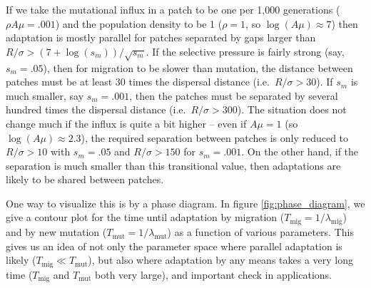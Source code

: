 \documentclass{article}
\newcommand{\migrate}{\lambda_\text{mig}}
\newcommand{\mutrate}{\lambda_\text{mut}}
\newcommand{\Tmig}{T_\text{mig}}
\newcommand{\Tmut}{T_\text{mut}}
\begin{document}
If we take the mutational influx in a patch to be one per 1,000 generations ($\rho A \mu = .001$)
and the population density to be 1 ($\rho =1$, so $\log(A\mu)\approx 7$)
then adaptation is mostly parallel for patches separated by gaps larger than $R/\sigma > (7+\log(s_m))/\sqrt{s_m}$.
If the selective pressure is fairly strong (say, $s_m=.05$),
then for migration to be slower than mutation,
the distance between patches must be at least 30 times the dispersal distance (i.e.\ $R/\sigma > 30$).
If $s_m$ is much smaller, say $s_m = .001$, 
then the patches must be separated by several hundred times the dispersal distance (i.e.\ $R/\sigma > 300$).
The situation does not change much if the influx is quite a bit higher -- even if $A \mu = 1$ (so $\log(A\mu) \approx 2.3$),
the required separation between patches is only reduced to $R/\sigma > 10$ with $s_m=.05$ and $R/\sigma>150$ for $s_m=.001$.
On the other hand, if the separation is much smaller than this transitional value, 
then adaptations are likely to be shared between patches.

One way to visualize this is by a phase diagram.
In figure \ref{fig:phase_diagram},
we give a contour plot for the time until adaptation by migration ($\Tmig = 1/\migrate$) and by new mutation ($\Tmut=1/\mutrate$)
as a function of various parameters. 
This gives us an idea of not only the parameter space where parallel adaptation is likely ($\Tmig \ll \Tmut$),
but also where adaptation by any means takes a very long time ($\Tmig$ and $\Tmut$ both very large),
and important check in applications.
\end{document}
